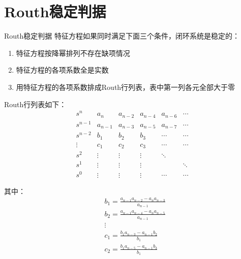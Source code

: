 \section{Routh稳定判据}
\begin{definition}{Routh稳定判据}
    特征方程如果同时满足下面三个条件，闭环系统是稳定的：
    \begin{enumerate}
        \item 特征方程按降幂排列不存在缺项情况
        \item 特征方程的各项系数全是实数
        \item 用特征方程的各项系数排成Routh行列表，表中第一列各元全部大于零
    \end{enumerate}
\end{definition}
\begin{definition}
    Routh行列表如下：
    \begin{equation*}
        \begin{array}{cccccc}
            s^n & a_n& a_{n-2} & a_{n-4} & a_{n-6} & \cdots \\
            s^{n-1}&  a_{n-1} & a_{n-3} & a_{n-5} & a_{n-7} & \cdots \\
            s^{n-2} & b_1 & b_2 &b_3 & \cdots & \cdots \\
            \vdots  & c_1 & c_2 &c_3 & \cdots &\cdots \\
            s^2 & \vdots & \vdots & \vdots & \ddots & \\ 
            s^1 & \vdots & \vdots & \vdots & & \ddots \\
            s^0 & \vdots & \vdots & \vdots &\cdots & \cdots 
        \end{array}
    \end{equation*}
    
    其中：
    \begin{equation*}
        \begin{split}
            & b_1 = \frac{a_{n-1 }a_{n-2}-a_{n} a_{n-3}}{a_{n-1}} \\
            & b_2 = \frac{a_{n-1}a_{n-4}-a_n a_{n-5}}{a_{n-1}} \\
            & \vdots \\
            & c_1 = \frac{b_1 a_{n-3}- a_{n-1} b_2} {b_1} \\
            & c_2 = \frac{b_1 a_{n-5} - a_{n-1} b_3}{b_1}
        \end{split}
    \end{equation*}


\end{definition}
